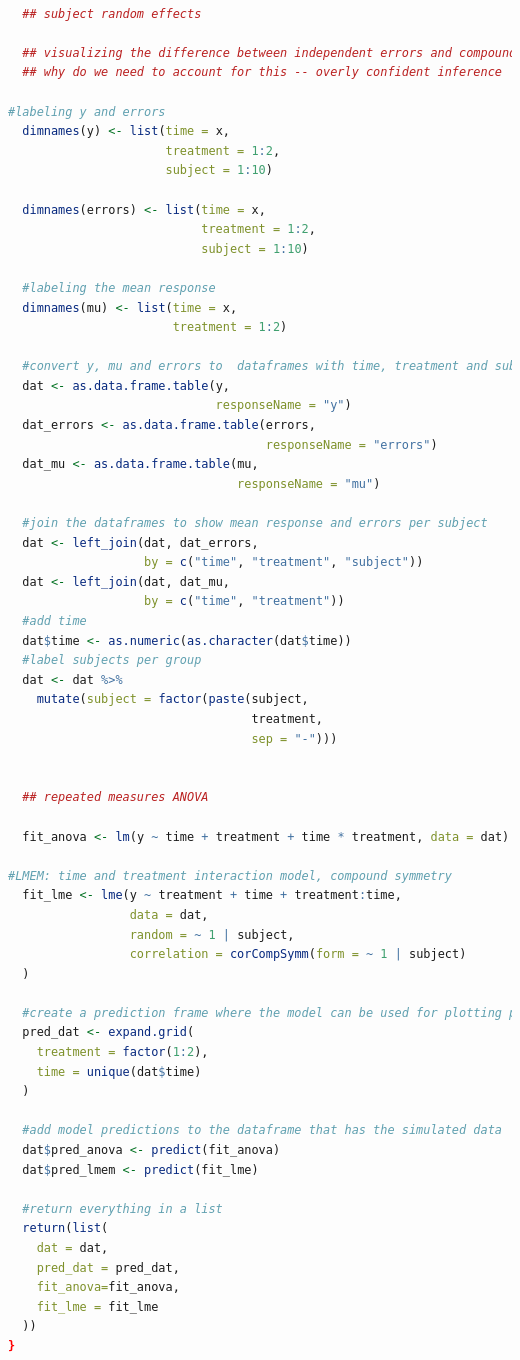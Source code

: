 \documentclass[
]{article}
\begin{document}
\begin{lstlisting}[language=R]
  
  ## subject random effects
  
  ## visualizing the difference between independent errors and compound symmetry
  ## why do we need to account for this -- overly confident inference
  
#labeling y and errors  
  dimnames(y) <- list(time = x, 
                      treatment = 1:2, 
                      subject = 1:10)

  dimnames(errors) <- list(time = x, 
                           treatment = 1:2, 
                           subject = 1:10)
  
  #labeling the mean response
  dimnames(mu) <- list(time = x, 
                       treatment = 1:2)
  
  #convert y, mu and errors to  dataframes with time, treatment and subject columns
  dat <- as.data.frame.table(y, 
                             responseName = "y")
  dat_errors <- as.data.frame.table(errors, 
                                    responseName = "errors")
  dat_mu <- as.data.frame.table(mu, 
                                responseName = "mu")
  
  #join the dataframes to show mean response and errors per subject
  dat <- left_join(dat, dat_errors, 
                   by = c("time", "treatment", "subject"))
  dat <- left_join(dat, dat_mu, 
                   by = c("time", "treatment"))
  #add time
  dat$time <- as.numeric(as.character(dat$time))
  #label subjects per group
  dat <- dat %>%
    mutate(subject = factor(paste(subject, 
                                  treatment, 
                                  sep = "-")))
  
  
  ## repeated measures ANOVA 
  
  fit_anova <- lm(y ~ time + treatment + time * treatment, data = dat)
  
#LMEM: time and treatment interaction model, compound symmetry 
  fit_lme <- lme(y ~ treatment + time + treatment:time,
                 data = dat,
                 random = ~ 1 | subject,
                 correlation = corCompSymm(form = ~ 1 | subject)
  )
  
  #create a prediction frame where the model can be used for plotting purposes
  pred_dat <- expand.grid(
    treatment = factor(1:2), 
    time = unique(dat$time)
  )
  
  #add model predictions to the dataframe that has the simulated data
  dat$pred_anova <- predict(fit_anova)
  dat$pred_lmem <- predict(fit_lme)

  #return everything in a list
  return(list(
    dat = dat,
    pred_dat = pred_dat,
    fit_anova=fit_anova,
    fit_lme = fit_lme
  ))
}


\end{lstlisting}
\end{document}
